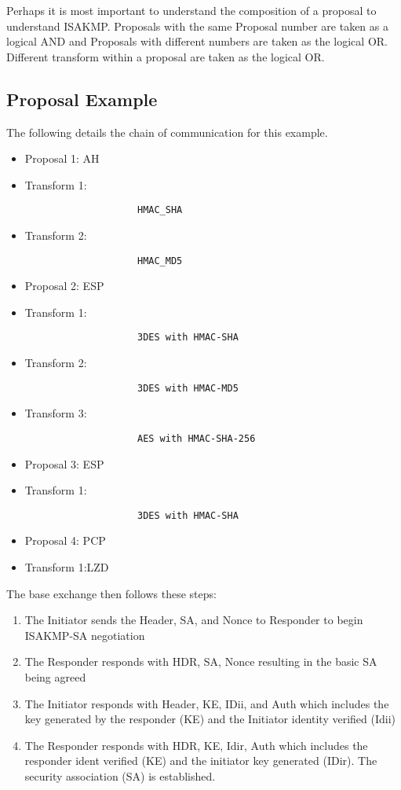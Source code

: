 \documentclass{article}
\begin{document}
Perhaps it is most important to understand the composition of a proposal to understand ISAKMP. Proposals with the same Proposal number are taken as a logical AND and Proposals with different numbers are taken as the logical OR. Different transform within a proposal are taken as the logical OR. 

\subsection {Proposal Example}

The following details the chain of communication for this example. 

\begin{itemize}
\item Proposal 1: AH
\item Transform 1: \begin{verbatim}
					HMAC_SHA
					\end{verbatim}	 
\item Transform 2: \begin{verbatim}
					HMAC_MD5
					\end{verbatim}
\item Proposal 2: ESP
\item Transform 1: \begin{verbatim}
					3DES with HMAC-SHA
					\end{verbatim}
\item Transform 2: \begin{verbatim}
					3DES with HMAC-MD5
					\end{verbatim}
\item Transform 3: \begin{verbatim}
					AES with HMAC-SHA-256
					\end{verbatim}
\item Proposal 3: ESP
\item Transform 1: \begin{verbatim}
					3DES with HMAC-SHA
					\end{verbatim}
\item Proposal 4: PCP
\item Transform 1:LZD
\end{itemize}

The base exchange then follows these steps:

\begin{enumerate}
\item The Initiator sends the Header, SA, and Nonce to Responder to begin ISAKMP-SA negotiation
\item The Responder responds with HDR, SA, Nonce resulting in the basic SA being agreed 
\item The Initiator responds with Header, KE, IDii, and Auth which includes the key generated by the responder (KE) and the Initiator identity verified (Idii)
\item The Responder responds with HDR, KE, Idir, Auth which includes the responder ident verified (KE) and the initiator key generated (IDir). The security association (SA) is established. 
\end{enumerate}
\end{document}

